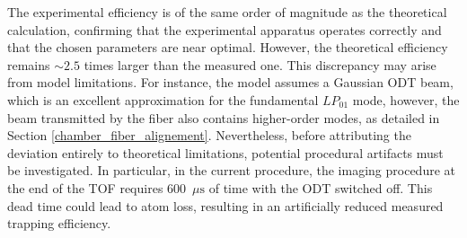 The experimental efficiency is of the same order of magnitude as the theoretical calculation, confirming that the experimental apparatus operates correctly and that the chosen parameters are near optimal. However, the theoretical efficiency remains $\sim2.5$ times larger than the measured one. This discrepancy may arise from model limitations. For instance, the model assumes a Gaussian ODT beam, which is an excellent approximation for the fundamental $LP_{01}$ mode, however, the beam transmitted by the fiber also contains higher-order modes, as detailed in Section \ref{chamber_fiber_alignement}.
Nevertheless, before attributing the deviation entirely to theoretical limitations, potential procedural artifacts must be investigated. In particular, in the current procedure, the imaging procedure at the end of the TOF requires 600~$\mu\text{s}$ of time with the ODT switched off. This dead time could lead to atom loss, resulting in an artificially reduced measured trapping efficiency.